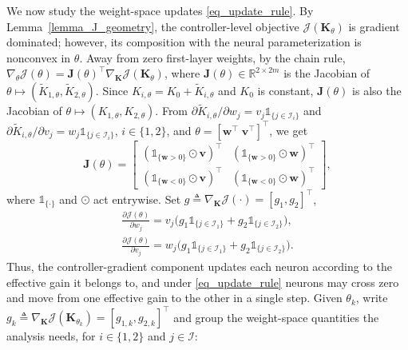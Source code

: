 \documentclass[letterpaper, 10 pt, conference]{ieeeconf}
\newcommand{\R}{\mathbb{R}}
\newcommand{\bv}{\mathbf{v}}
\newcommand{\bw}{\mathbf{w}}
\newcommand{\bJ}{\mathbf{J}}
\newcommand{\bK}{\mathbf{K}}
\newcommand{\cJ}{\mathcal{J}}
\newcommand{\sI}{\mathscr{I}}
\newcommand{\ind}[1]{\mathds{1}_{#1}}
\newcommand{\Lemm}{Lemma}
\begin{document}
We now study the weight-space updates \eqref{eq_update_rule}. By \Lemm~\ref{lemma_J_geometry}, the controller-level objective $\cJ(\bK_{\theta})$ is gradient dominated; however, its composition with the neural parameterization is nonconvex in $\theta$. Away from zero first-layer weights, by the chain rule, $\nabla_{\theta} \cJ(\theta) =\bJ(\theta)^\top \nabla_{\bK} \cJ(\bK_{\theta})$, where $\bJ(\theta)\in\R^{2\times 2m}$ is the Jacobian of $\theta \mapsto (\widetilde{K}_{1,\theta}, \widetilde{K}_{2,\theta})$. Since $K_{i,\theta} = K_{0} {+} \widetilde{K}_{i,\theta}$ and $K_{0}$ is constant, $\bJ(\theta)$ is also the Jacobian of $\theta \mapsto (K_{1,\theta}, K_{2,\theta})$. From ${\partial \widetilde{K}_{i,\theta}}/{\partial w_{j}} = v_{j} \ind{\{j \in \sI_{i}\}}$ and ${\partial \widetilde{K}_{i,\theta}}/{\partial v_{j}} {=} w_{j} \ind{\{j {\in} \sI_{i}\}}$, $i {\in} \{1,2\}$, and $\theta {=} [\bw^{\top} \; \bv^{\top}]^{\top}$, we get
\begin{equation}
    \bJ(\theta)
    =
    \begin{bmatrix}
        (\ind{\{\bw>0\}}\odot\bv)^\top & (\ind{\{\bw>0\}}\odot\bw)^\top \\
        (\ind{\{\bw<0\}}\odot\bv)^\top & (\ind{\{\bw<0\}}\odot\bw)^\top
    \end{bmatrix},
\end{equation}
where $\ind{\{\cdot\}}$ and $\odot$ act entrywise. Set $g {\triangleq} \nabla_{\bK} \cJ (\cdot) {=} [g_{1}, g_{2}]^{\top}$,
\begin{equation}
    \begin{gathered}
        \frac{\partial \cJ(\theta)}{\partial w_{j}}
        =
        v_{j} \bigl(g_{1} \ind{\{j \in \sI_{1}\}} + g_{2} \ind{\{j \in \sI_{2}\}} \bigr),
        \\
        \frac{\partial \cJ(\theta)}{\partial v_{j}}
        =
        w_{j} \bigl(g_{1} \ind{\{j \in \sI_{1}\}} + g_{2} \ind{\{j \in \sI_{2}\}} \bigr).
    \end{gathered}
\end{equation}
Thus, the controller-gradient component updates each neuron according to the effective gain it belongs to, and under \eqref{eq_update_rule} neurons may cross zero and move from one effective gain to the other in a single step.  Given $\theta_{k}$, write $g_{k} \triangleq \nabla_{\bK}\cJ(\bK_{\theta_{k}}) = [g_{1,k},g_{2,k}]^{\top}$ and group the weight-space quantities the analysis needs, for $i \in \{1,2\}$ and $j \in \sI$:
\end{document}
